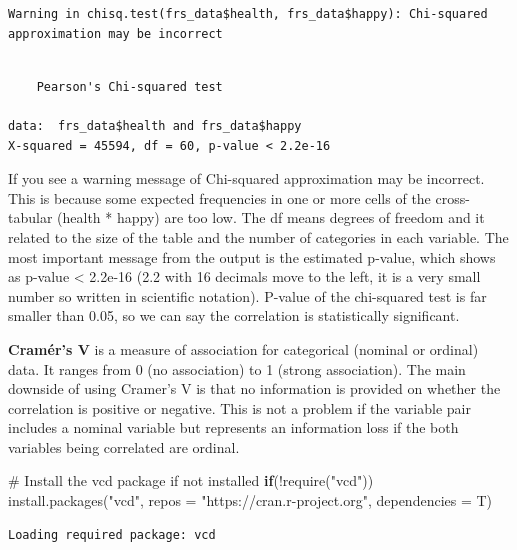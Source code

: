 \documentclass[
  letterpaper,
  DIV=11,
  numbers=noendperiod]{scrreprt}
\newenvironment{Shaded}{\begin{snugshade}}{\end{snugshade}}
\newcommand{\AttributeTok}[1]{\textcolor[rgb]{0.40,0.45,0.13}{#1}}
\newcommand{\CommentTok}[1]{\textcolor[rgb]{0.37,0.37,0.37}{#1}}
\newcommand{\ControlFlowTok}[1]{\textcolor[rgb]{0.00,0.23,0.31}{\textbf{#1}}}
\newcommand{\FunctionTok}[1]{\textcolor[rgb]{0.28,0.35,0.67}{#1}}
\newcommand{\NormalTok}[1]{\textcolor[rgb]{0.00,0.23,0.31}{#1}}
\newcommand{\SpecialCharTok}[1]{\textcolor[rgb]{0.37,0.37,0.37}{#1}}
\newcommand{\StringTok}[1]{\textcolor[rgb]{0.13,0.47,0.30}{#1}}
\begin{document}
\begin{verbatim}
Warning in chisq.test(frs_data$health, frs_data$happy): Chi-squared
approximation may be incorrect
\end{verbatim}

\begin{verbatim}

    Pearson's Chi-squared test

data:  frs_data$health and frs_data$happy
X-squared = 45594, df = 60, p-value < 2.2e-16
\end{verbatim}

If you see a warning message of Chi-squared approximation may be
incorrect. This is because some expected frequencies in one or more
cells of the cross-tabular (health * happy) are too low. The df means
degrees of freedom and it related to the size of the table and the
number of categories in each variable. The most important message from
the output is the estimated p-value, which shows as p-value \textless{}
2.2e-16 (2.2 with 16 decimals move to the left, it is a very small
number so written in scientific notation). P-value of the chi-squared
test is far smaller than 0.05, so we can say the correlation is
statistically significant.

\textbf{Cramér's V} is a measure of association for categorical (nominal
or ordinal) data. It ranges from 0 (no association) to 1 (strong
association). The main downside of using Cramer's V is that no
information is provided on whether the correlation is positive or
negative. This is not a problem if the variable pair includes a nominal
variable but represents an information loss if the both variables being
correlated are ordinal.

\begin{Shaded}
\begin{Highlighting}[]
\CommentTok{\# Install the \textquotesingle{}vcd\textquotesingle{} package if not installed }
\ControlFlowTok{if}\NormalTok{(}\SpecialCharTok{!}\FunctionTok{require}\NormalTok{(}\StringTok{"vcd"}\NormalTok{))   }
\FunctionTok{install.packages}\NormalTok{(}\StringTok{"vcd"}\NormalTok{, }\AttributeTok{repos =} \StringTok{"https://cran.r{-}project.org"}\NormalTok{, }\AttributeTok{dependencies =}\NormalTok{ T)}
\end{Highlighting}
\end{Shaded}

\begin{verbatim}
Loading required package: vcd
\end{verbatim}
\end{document}
